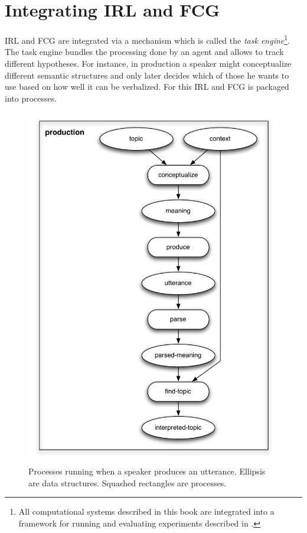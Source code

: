 \section{Integrating IRL and FCG}
\label{s:irl-fcg-integration}
IRL and FCG are integrated via a mechanism which is called 
the \emph{task engine}\footnote{All computational systems described in this 
book are integrated into a framework for running and evaluating 
experiments described in \cite{steels2010babel}.}.
The task engine bundles the processing done by an agent and allows to track
different hypotheses. For instance, in production a speaker might conceptualize
different semantic structures and only later decides which of those he wants
to use based on how well it can be verbalized. For this IRL and FCG 
is packaged into processes.
\begin{figure}
\begin{center}
\includegraphics[width=0.8\columnwidth]{figs/production}
\caption[Processes running when a speaker produces an utterance]{
Processes running when a speaker produces an utterance. Ellipsis are
data structures. Squashed rectangles are processes.}
\label{f:production}
\end{center}
\end{figure}

